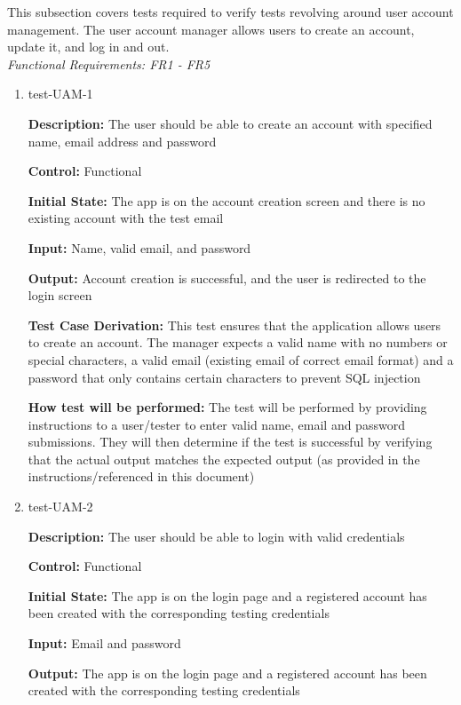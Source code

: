 \documentclass[12pt, titlepage]{article}
\begin{document}
This subsection covers tests required to verify tests revolving around user account management. The user account manager allows users to create an account, update it, and log in and out.\\
\textit{Functional Requirements: FR1 - FR5}

\begin{enumerate}

\item{test-UAM-1\\}

\textbf{Description:} The user should be able to create an account with specified name, email address and password

\textbf{Control:} Functional
					
\textbf{Initial State:} The app is on the account creation screen and there is no existing account with the test email
					
\textbf{Input:} Name, valid email, and password
					
\textbf{Output:} Account creation is successful, and the user is redirected to the login screen

\textbf{Test Case Derivation:} This test ensures that the application allows users to create an account. The manager expects a valid name with no numbers or special characters, a valid email (existing email of correct email format) and a password that only contains certain characters to prevent SQL injection
					
\textbf{How test will be performed:} The test will be performed by providing instructions to a user/tester to enter valid name, email and password submissions. They will then determine if the test is successful by verifying that the actual output matches the expected output (as provided in the instructions/referenced in this document)

\item{test-UAM-2\\}

\textbf{Description:} The user should be able to login with valid credentials

\textbf{Control:} Functional
					
\textbf{Initial State:} The app is on the login page and a registered account has been created with the corresponding testing credentials
					
\textbf{Input:} Email and password
					
\textbf{Output:} The app is on the login page and a registered account has been created with the corresponding testing credentials


\end{enumerate}
\end{document}
